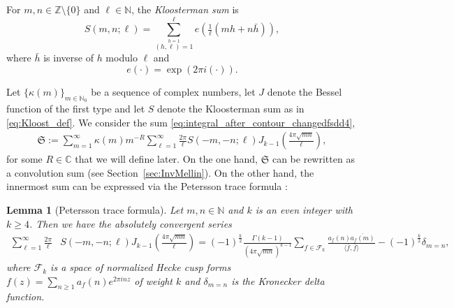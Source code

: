 \documentclass[]{article}
\newtheorem{lemma}[thm]{Lemma}
\newcommand{\mathcalSsumdef}{\mathfrak{S}}
\begin{document}
For $m, n \in \mathbb{Z} \setminus \{ 0 \}$ and $\ell \in \mathbb{N}$, the \textit{Kloosterman sum} is \cite[(1.1.7)]{motohashi1997spectral} \begin{equation}\label{eq:Kloost_def}
        S(m,n;\ell) = \sum_{\stackrel{h=1}{(h,\ell)=1}}^\ell e(\tfrac{1}{\ell} (mh+n \bar{h})),
    \end{equation}
    where $\bar{h}$ is inverse of $h$ modulo $\ell$ and 
     \begin{equation}\label{def:exponential_short}
     e(  \cdot ) = \exp(2 \pi i (\cdot) ).          
     \end{equation}
 


Let $\{ \kappa(m)\}_{m \in \mathbb{N}_0}$ be a sequence of complex numbers, let $J$ denote the Bessel function of the first type and let $S$ denote the Kloosterman sum as in \eqref{eq:Kloost_def}. We consider the sum \eqref{eq:integral_after_contour_changedfsdd4}, 
\begin{equation}
	\begin{split}
		\mathcalSsumdef:=  \sum_{m=1}^\infty \kappa(m) m^{-R}  \sum_{\ell=1}^\infty \frac{2 \pi }{\ell} S(-m,-n; \ell)  J_{k-1} ( \tfrac{4 \pi \sqrt{mn}}{\ell}),
	\end{split}
\end{equation}
for some $R \in \mathbb{C}$ that we will define later. 
On the one hand, $\mathcalSsumdef$ can be rewritten as a convolution sum (see Section~\ref{sec:InvMellin}). On the other hand, the innermost sum can be expressed via the Petersson trace formula \cite[Theorem 9.6]{iwaniec2021spectral}:
\begin{lemma} [Petersson trace formula]\label{lem:petersson_trace_formula}  Let $m,n  \in \mathbb{N}$ and 
$k$ is an even integer with $k\ge 4$. Then  we have the absolutely convergent series 
\begin{equation}
\begin{split}
      \sum_{\ell=1}^\infty  \frac{2 \pi }{\ell} &S(-m,-n; \ell)  J_{k-1} ( \tfrac{4 \pi \sqrt{mn}}{\ell})= (-1)^{\tfrac{k}{2}} \frac{\Gamma(k-1)}{ (4 \pi \sqrt{mn})^{k-1} } \sum_{f \in \mathcal{F}_k}  \frac{a_f(n) \overline{a_f(m)}}{\langle \bar f, \bar f \rangle }  - (-1)^{\tfrac{k}{2}} \delta_{m=n},
\end{split}
\end{equation}
where $\mathcal{F}_k$ is a space of normalized Hecke cusp forms $f(z)=\sum_{n\geq 1}a_f(n)e^{2\pi i n z}$ of weight $k$ and $\delta_{m=n}$ is the Kronecker delta function.
\end{lemma}
\end{document}
